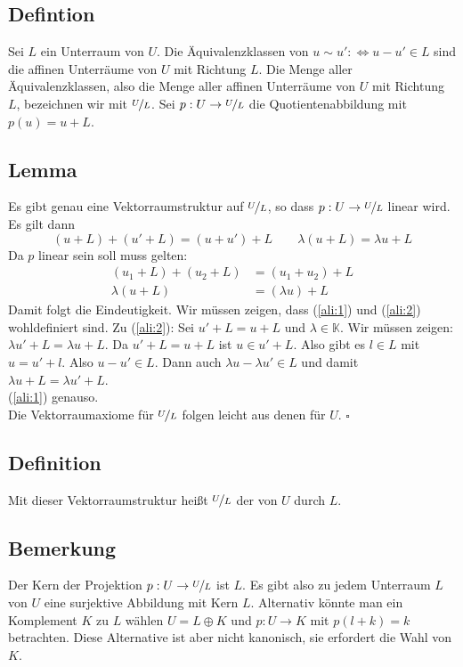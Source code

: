 \subsection[Definition: Quotientenvektorraum]{Defintion} %
\label{sub:33}
Sei $L$ ein Unterraum von $U$. Die Äquivalenzklassen von $u \sim u' :\Leftrightarrow u-u' \in L$ sind die affinen Unterräume von $U$ mit Richtung $L$. Die Menge aller Äquivalenzklassen, also die Menge aller affinen Unterräume von $U$ mit Richtung $L$, bezeichnen wir mit $\nicefrac{U}{L}$. Sei $p : U \to \nicefrac{U}{L}$ die 
Quotientenabbildung mit $p(u)= u + L$.

\subsection[Lemma über die Eindeutigkeit von $\nicefrac{U}{L}$]{Lemma} %
\label{sub:34}
Es gibt genau eine Vektorraumstruktur auf $\nicefrac{U}{L}$, so dass $p : U \to \nicefrac{U}{L}$ linear wird. Es gilt dann 
\[
	(u+L) + (u' +L) = (u+u') + L \qquad \lambda (u+L) = \lambda u + L
\]
Da $p$ linear sein soll muss gelten:
\begin{align}
	(u_1 + L ) + (u_2 + L) &= (u_1 + u_2) + L   \label{ali:1} \tag{$*$}\\
	\lambda (u + L) &= (\lambda u) + L  \label{ali:2} \tag{$\#$}
\end{align}
Damit folgt die Eindeutigkeit. Wir müssen zeigen, dass (\ref{ali:1}) und (\ref{ali:2}) wohldefiniert sind. Zu (\ref{ali:2}): 
Sei $u' + L = u + L$ und $\lambda  \in \mathds{K} $. Wir müssen zeigen: $\lambda u' + L = \lambda u +L$. Da $u' + L = u + L$ ist $u \in u' +L$.
Also gibt es $l \in L$ mit $u =u' + l$. Also $u-u' \in L$. Dann auch $\lambda u - \lambda u' \in L$ und damit $\lambda u + L = \lambda u' + L$. \\
(\ref{ali:1}) genauso. \\
Die Vektorraumaxiome für $\nicefrac{U}{L}$ folgen leicht aus denen für $U$. \hfill \( \square \)

\subsection[Definition: Quotientenvektorraum]{Definition} %
\label{sub:35}
Mit dieser Vektorraumstruktur heißt $\nicefrac{U}{L}$ der  von $U$ durch $L$. 

\subsection[Bemerkung über nicht-kanonisches Komplement und induzierte Abbildung]{Bemerkung} %
\label{sub:36}
Der Kern der Projektion $p : U \to \nicefrac{U}{L}$ ist $L$.  Es gibt also zu jedem Unterraum $L$ von $U$ eine surjektive Abbildung mit Kern $L$. Alternativ könnte man
ein Komplement $K$ zu $L$ wählen $U= L \oplus K$ und $p : U \to K$ mit $p(l+k) = k$ betrachten. Diese Alternative ist aber nicht kanonisch, sie erfordert die Wahl von $K$.

